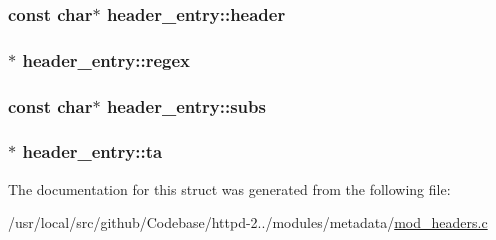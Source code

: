\subsubsection[{\texorpdfstring{header}{header}}]{\setlength{\rightskip}{0pt plus 5cm}const char$\ast$ header\+\_\+entry\+::header}\hypertarget{structheader__entry_a4e6ec5b76041d380cfb359e4d1f981e0}{}\label{structheader__entry_a4e6ec5b76041d380cfb359e4d1f981e0}
\subsubsection[{\texorpdfstring{regex}{regex}}]{$\ast$ header\+\_\+entry\+::regex}\hypertarget{structheader__entry_a872ecb8432a0e9b9b76a0cd1ee86ba32}{}\label{structheader__entry_a872ecb8432a0e9b9b76a0cd1ee86ba32}
\subsubsection[{\texorpdfstring{subs}{subs}}]{\setlength{\rightskip}{0pt plus 5cm}const char$\ast$ header\+\_\+entry\+::subs}\hypertarget{structheader__entry_ad4c8f3594ee1b780330649358ae4d2a4}{}\label{structheader__entry_ad4c8f3594ee1b780330649358ae4d2a4}
\subsubsection[{\texorpdfstring{ta}{ta}}]{$\ast$ header\+\_\+entry\+::ta}\hypertarget{structheader__entry_afe7f682b2b3f775c7db623ae1bc93e02}{}\label{structheader__entry_afe7f682b2b3f775c7db623ae1bc93e02}


The documentation for this struct was generated from the following file\+:\begin{DoxyCompactItemize}
\item 
/usr/local/src/github/\+Codebase/httpd-\/2../modules/metadata/\hyperlink{mod__headers_8c}{mod\+\_\+headers.\+c}\end{DoxyCompactItemize}

